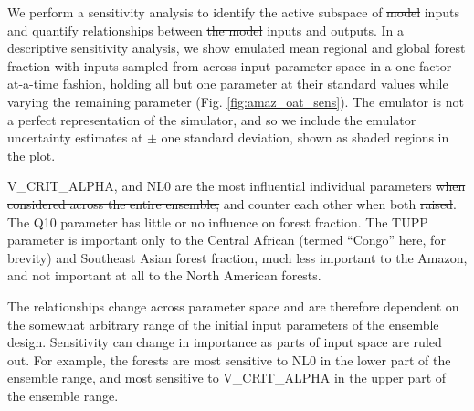 \documentclass[esd, manuscript]{copernicus}
\providecommand{\DIFadd}[1]{{\protect\color{blue}\uwave{#1}}} %
\providecommand{\DIFdel}[1]{{\protect\color{red}\sout{#1}}}                      %
\providecommand{\DIFaddbegin}{} %
\providecommand{\DIFaddend}{} %
\providecommand{\DIFdelbegin}{} %
\providecommand{\DIFdelend}{} %
\begin{document}
We perform a sensitivity analysis to identify the active subspace of \DIFdelbegin \DIFdel{model }\DIFdelend \DIFaddbegin \DIFadd{simulator }\DIFaddend inputs and quantify relationships between \DIFdelbegin \DIFdel{the model }\DIFdelend inputs and outputs. In a descriptive sensitivity analysis, we show emulated mean regional and global forest fraction with inputs sampled from across input parameter space in a one-factor-at-a-time fashion, holding all but one parameter at their standard values while varying the remaining parameter (Fig. \ref{fig:amaz_oat_sens}). The emulator is not a perfect representation of the simulator, and so we include the emulator uncertainty estimates at $\pm$ one standard deviation, shown as shaded regions in the plot.

V\_CRIT\_ALPHA, and NL0 are the most influential individual parameters \DIFdelbegin \DIFdel{when considered across the entire ensemble, }\DIFdelend and counter each other when both \DIFdelbegin \DIFdel{raised}\DIFdelend \DIFaddbegin \DIFadd{increased}\DIFaddend . The Q10 parameter has little or no influence on forest fraction. The TUPP parameter is important only to the Central African (termed ``Congo'' here, for brevity) and Southeast Asian forest fraction, much less important to the Amazon, and not important at all to the North American forests. 

The relationships change across parameter space and are therefore dependent on the somewhat arbitrary range of the initial input parameters of the ensemble design. Sensitivity can change in importance as parts of input space are ruled out. For example, the forests are most sensitive to NL0 in the lower part of the ensemble range, and most sensitive to V\_CRIT\_ALPHA in the upper part of the ensemble range.

\end{document}
